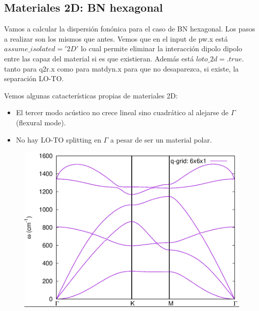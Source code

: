 \subsection{Materiales 2D: BN hexagonal}

  Vamos a calcular la dispersión fonónica para el caso de BN hexagonal. Los pasos a realizar son los mismos que antes. Vemos que en el input de pw.x está $assume\_isolated='2D'$ lo cual permite eliminar la interacción dipolo dipolo entre las capaz del material si es que existieran. Además está $loto\_2d=.true.$ tanto para q2r.x como para matdyn.x para que no desaparezca, si existe, la separación LO-TO.


  Vemos algunas catacterísticas propias de materiales 2D:
    \begin{itemize}
      \item El tercer modo acústico no crece lineal sino cuadrático al alejarse de $\Gamma$ (flexural mode).
      \item No hay LO-TO splitting en $\Gamma$ a pesar de ser un material polar.
    \end{itemize}

    \begin{figure}[H]
        \centering
        \includegraphics[scale = 0.4]{figs/D5/BN_disp.png}
    \end{figure}

